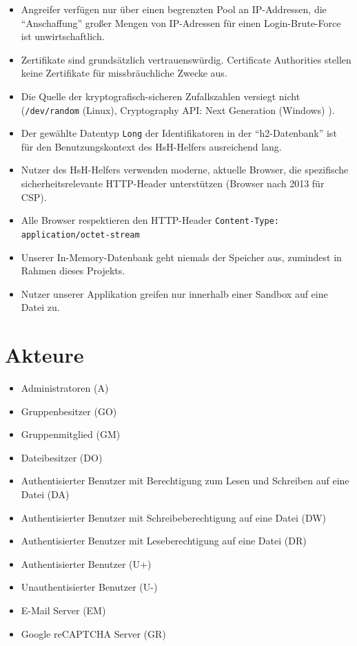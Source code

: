 \documentclass[fontsize=12pt,DIV=14,BCOR=10mm,a4paper,parskip=half-,headsepline,headinclude,english,ngerman,bibliography=totocnumbered]{scrreprt}
\begin{document}
\begin{itemize}
  \item Angreifer verfügen nur über einen begrenzten Pool an IP-Addressen, die \enquote{Anschaffung} großer Mengen von IP-Adressen für einen Login-Brute-Force ist unwirtschaftlich.
  \item Zertifikate sind grundsätzlich vertrauenswürdig. Certificate Authorities stellen keine Zertifikate für missbräuchliche Zwecke aus.
  \item Die Quelle der kryptografisch-sicheren Zufallszahlen versiegt nicht (\texttt{/dev/random} (Linux), Cryptography API: Next Generation (Windows) \autocite{Windows.SecureRandom}).
  \item Der gewählte Datentyp \texttt{Long} der Identifikatoren in der \enquote{h2-Datenbank} ist für den Benutzungskontext des HsH-Helfers ausreichend lang.
  \item Nutzer des HsH-Helfers verwenden moderne, aktuelle Browser, die spezifische sicherheitsrelevante HTTP-Header unterstützen (Browser nach 2013 für CSP).
  \item Alle Browser respektieren den HTTP-Header \texttt{Content-Type: application/octet-stream}
  \item Unserer In-Memory-Datenbank geht niemals der Speicher aus, zumindest in Rahmen dieses Projekts.
  \item Nutzer unserer Applikation greifen nur innerhalb einer Sandbox auf eine Datei zu.
\end{itemize}

\renewcommand*{\chapterheadstartvskip}{\vspace*{\topskip}}

\chapter{Akteure}

\begin{itemize}
  \item Administratoren (A)
  \item Gruppenbesitzer (GO)
  \item Gruppenmitglied (GM)
  \item Dateibesitzer (DO)
  \item Authentisierter Benutzer mit Berechtigung zum Lesen und Schreiben auf eine Datei (DA)
  \item Authentisierter Benutzer mit Schreibeberechtigung auf eine Datei (DW)
  \item Authentisierter Benutzer mit Leseberechtigung auf eine Datei (DR)
  \item Authentisierter Benutzer (U+)
  \item Unauthentisierter Benutzer (U-)
  \item E-Mail Server (EM)
  \item Google reCAPTCHA Server (GR)
\end{itemize}
\end{document}
